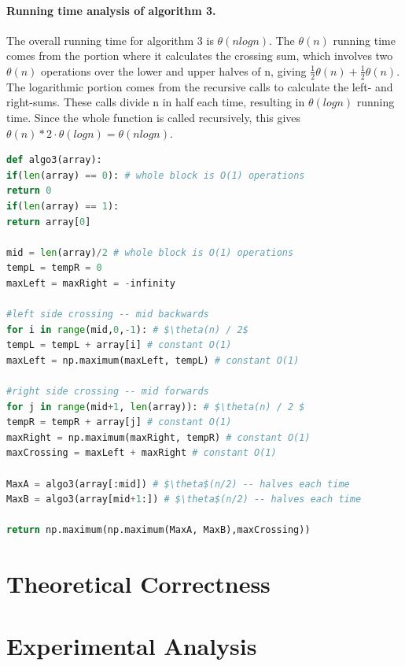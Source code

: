 \documentclass[a4paper,12pt]{article}
\begin{document}
\paragraph{Running time analysis of algorithm 3.} The overall running time for algorithm 3 is $\theta(n log n)$. The $\theta(n)$ running time comes from the portion where it calculates the crossing sum, which involves two $\theta(n)$ operations over the lower and upper halves of n, giving $ \frac{1}{2} \theta(n) + \frac{1}{2} \theta(n)$. The logarithmic portion comes from the recursive calls to calculate the left- and right-sums. These calls divide n in half each time, resulting in $\theta(log n)$ running time. Since the whole function is called recursively, this gives $ \theta(n) * 2 \cdot \theta(log n) = \theta(n log n)$.


  \begin{lstlisting}[language=python,caption={pseudo code for $n\log(n)$ algorithm},mathescape]
def algo3(array):
if(len(array) == 0): # whole block is O(1) operations
return 0
if(len(array) == 1):
return array[0]

mid = len(array)/2 # whole block is O(1) operations
tempL = tempR = 0
maxLeft = maxRight = -infinity

#left side crossing -- mid backwards
for i in range(mid,0,-1): # $\theta(n) / 2$
tempL = tempL + array[i] # constant O(1)
maxLeft = np.maximum(maxLeft, tempL) # constant O(1)

#right side crossing -- mid forwards
for j in range(mid+1, len(array)): # $\theta(n) / 2 $
tempR = tempR + array[j] # constant O(1)
maxRight = np.maximum(maxRight, tempR) # constant O(1)
maxCrossing = maxLeft + maxRight # constant O(1)

MaxA = algo3(array[:mid]) # $\theta$(n/2) -- halves each time
MaxB = algo3(array[mid+1:]) # $\theta$(n/2) -- halves each time

return np.maximum(np.maximum(MaxA, MaxB),maxCrossing))
  \end{lstlisting}

\section*{Theoretical Correctness}

\section*{Experimental Analysis}
\end{document}
